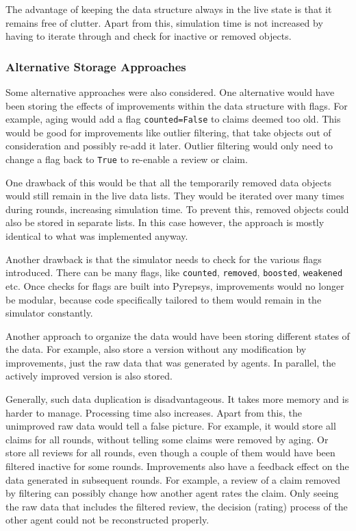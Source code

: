 \documentclass[%
    ]{\PathToTumTemplate/thesis/tum_thesis}
\begin{document}
The advantage of keeping the data structure always in the live state is that it remains free of clutter.
Apart from this, simulation time is not increased by having to iterate through and check for inactive or removed objects.

\subsubsection{Alternative Storage Approaches}

Some alternative approaches were also considered.
One alternative would have been storing the effects of improvements within the data structure with flags.
For example, aging would add a flag \lstinline{counted=False} to claims deemed too old.
This would be good for improvements like outlier filtering, that take objects out of consideration and possibly re-add it later.
Outlier filtering would only need to change a flag back to \lstinline{True} to re-enable a review or claim.

One drawback of this would be that all the temporarily removed data objects would still remain in the live data lists.
They would be iterated over many times during rounds, increasing simulation time.
To prevent this, removed objects could also be stored in separate lists.
In this case however, the approach is mostly identical to what was implemented anyway.

Another drawback is that the simulator needs to check for the various flags introduced.
There can be many flags, like \lstinline{counted}, \lstinline{removed}, \lstinline{boosted}, \lstinline{weakened} etc.
Once checks for flags are built into Pyrepsys, improvements would no longer be modular, because code specifically tailored to them would remain in the simulator constantly.

\vspace{6pt}

Another approach to organize the data would have been storing different states of the data.
For example, also store a version without any modification by improvements, just the raw data that was generated by agents.
In parallel, the actively improved version is also stored.

Generally, such data duplication is disadvantageous.
It takes more memory and is harder to manage.
Processing time also increases.
Apart from this, the unimproved raw data would tell a false picture.
For example, it would store all claims for all rounds, without telling some claims were removed by aging.
Or store all reviews for all rounds, even though a couple of them would have been filtered inactive for some rounds.
Improvements also have a feedback effect on the data generated in subsequent rounds.
For example, a review of a claim removed by filtering can possibly change how another agent rates the claim.
Only seeing the raw data that includes the filtered review, the decision (rating) process of the other agent could not be reconstructed properly.
\end{document}
